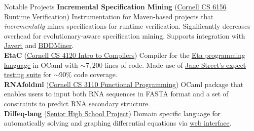  
\begin{rSection}{Notable Projects}
	\textbf{Incremental Specification Mining} (\href{https://github.com/cyankaet/spec-miners}{Cornell CS 6156 Runtime Verification\ExternalLink}) Instrumentation for Maven-based projects that \textit{incrementally} mines specifications for runtime verification. Significantly decreases overhead for evolutionary-aware specification mining. Supports integration with \href{https://dl.acm.org/doi/10.1145/1453101.1453150}{\underline{Javert}} and \href{https://github.com/cyankaet/spec-miners/blob/master/miners/bddminer.sh}{\underline{BDDMiner}}.
	\\
	\textbf{EtaC} (\href{http://www.cs.cornell.edu/courses/cs4120/2023sp/}{Cornell CS 4120 Intro to Compilers\ExternalLink}) Compiler for the \href{https://www.cs.cornell.edu/courses/cs4120/2023sp/project/language.pdf}{\underline{Eta programming language}} in OCaml with $\sim 7,200$ lines of code. Made use of \href{https://blog.janestreet.com/the-joy-of-expect-tests/}{\underline{Jane Street's expect testing suite}} for $\sim$90\% code coverage.
	\\
	\textbf{RNAfoldml} (\href{https://github.com/jpVinnie/RNAfoldml/}{Cornell CS 3110 Functional Programming\ExternalLink}) OCaml package that enables users to input both RNA sequences in FASTA format and a set of constraints to predict RNA secondary structure.
	\\
	\textbf{Diffeq-lang} (\href{https://github.com/jpVinnie/diffeq-lang/}{Senior High School Project\ExternalLink}) Domain specific language for automatically solving and graphing differential equations via \href{https://jpramos.me/diffeq-lang/web/}{\underline{web interface}}.
\end{rSection}